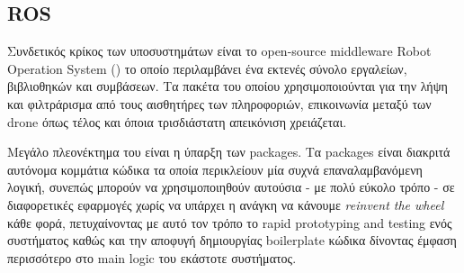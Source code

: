   \begin{table}[H]
        \caption[]{Jetson Nano Developer Kit Specifications}
        \label{tab:jetson-nano-specs}
        \centering
      \end{table}


\subsection{ROS} \label{sec:ROS}
Συνδετικός κρίκος των υποσυστημάτων είναι το open-source middleware Robot Operation System () \cite{ros} το οποίο 
πε\-ρι\-λα\-μβά\-νει ένα εκτενές σύνολο εργαλείων, βιβλιοθηκών και συ\-μβά\-σεων. Τα πακέτα του οποίου χρησιμοποιούνται για την
λήψη και φιλτράρισμα από τους αισθητήρες των πληροφοριών, επικοινωνία μεταξύ των drone όπως τέλος και 
όποια τρι\-σδιά\-στα\-τη απεικόνιση χρειάζεται.

Μεγάλο πλεονέκτημα του  είναι η ύπαρξη των packages. Τα packages είναι δια\-κρι\-τά αυτόνομα κομμάτια κώδικα τα οποία περικλείουν μία συχνά επαναλαμβανόμενη λογική, συνεπώς μπορούν να χρησιμοποιηθούν αυτούσια - με πολύ εύκολο τρόπο - σε διαφορετικές εφαρμογές χωρίς να υπάρχει η ανάγκη να κάνουμε \textit{reinvent the wheel} κάθε φορά, πετυχαίνοντας με αυτό τον τρόπο το rapid prototyping and testing ενός συστήματος καθώς και την αποφυγή δημιουργίας boilerplate κώδικα δίνοντας έμφαση περισσότερο στο main logic του εκάστοτε συστήματος. 

